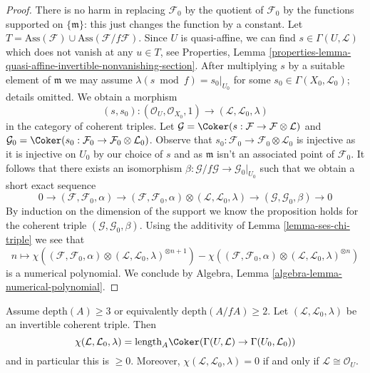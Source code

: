\begin{proof}
There is no harm in replacing $\mathcal{F}_0$ by the quotient
of $\mathcal{F}_0$ by the functions supported on $\{\mathfrak m\}$:
this just changes the function by a constant.
Let $T = \text{Ass}(\mathcal{F}) \cup \text{Ass}(\mathcal{F}/f\mathcal{F})$.
Since $U$ is quasi-affine, we can find $s \in \Gamma(U, \mathcal{L})$
which does not vanish at any $u \in T$, see
Properties, Lemma
\ref{properties-lemma-quasi-affine-invertible-nonvanishing-section}.
After multiplying $s$ by a suitable element of $\mathfrak m$
we may assume $\lambda(s \bmod f) = s_0|_{U_0}$ for some
$s_0 \in \Gamma(X_0, \mathcal{L}_0)$; details omitted.
We obtain a morphism
$$
(s, s_0) :
(\mathcal{O}_U, \mathcal{O}_{X_0}, 1)
\longrightarrow
(\mathcal{L}, \mathcal{L}_0, \lambda)
$$
in the category of coherent triples. Let
$\mathcal{G} = \Coker(s : \mathcal{F} \to \mathcal{F} \otimes \mathcal{L})$
and
$\mathcal{G}_0 = \Coker(s_0 : \mathcal{F}_0 \to
\mathcal{F}_0 \otimes \mathcal{L}_0)$. Observe that $s_0 : \mathcal{F}_0 \to
\mathcal{F}_0 \otimes \mathcal{L}_0$ is injective as it is injective
on $U_0$ by our choice of $s$ and as $\mathfrak m$ isn't an
associated point of $\mathcal{F}_0$. It follows that
there exists an
isomorphism $\beta : \mathcal{G}/f\mathcal{G} \to \mathcal{G}_0|_{U_0}$
such that we obtain a short exact sequence
$$
0 \to
(\mathcal{F}, \mathcal{F}_0, \alpha) \to
(\mathcal{F}, \mathcal{F}_0, \alpha) \otimes
(\mathcal{L}, \mathcal{L}_0, \lambda) \to
(\mathcal{G}, \mathcal{G}_0, \beta) \to 0
$$
By induction on the dimension of the support we know the proposition
holds for the coherent triple $(\mathcal{G}, \mathcal{G}_0, \beta)$.
Using the additivity of Lemma \ref{lemma-ses-chi-triple}
we see that
$$
n \longmapsto 
\chi((\mathcal{F}, \mathcal{F}_0, \alpha) \otimes
(\mathcal{L}, \mathcal{L}_0, \lambda)^{\otimes n + 1})
-
\chi((\mathcal{F}, \mathcal{F}_0, \alpha) \otimes
(\mathcal{L}, \mathcal{L}_0, \lambda)^{\otimes n})
$$
is a numerical polynomial. We conclude by
Algebra, Lemma \ref{algebra-lemma-numerical-polynomial}.
\end{proof}

\begin{lemma}
\label{lemma-nonnegative-chi-triple}
Assume $\text{depth}(A) \geq 3$ or equivalently
$\text{depth}(A/fA) \geq 2$. Let $(\mathcal{L}, \mathcal{L}_0, \lambda)$
be an invertible coherent triple. Then
$$
\chi(\mathcal{L}, \mathcal{L}_0, \lambda) =
\text{length}_A \Coker(\Gamma(U, \mathcal{L}) \to \Gamma(U_0, \mathcal{L}_0))
$$
and in particular this is $\geq 0$. Moreover, 
$\chi(\mathcal{L}, \mathcal{L}_0, \lambda) = 0$ if and only if
$\mathcal{L} \cong \mathcal{O}_U$.
\end{lemma}

